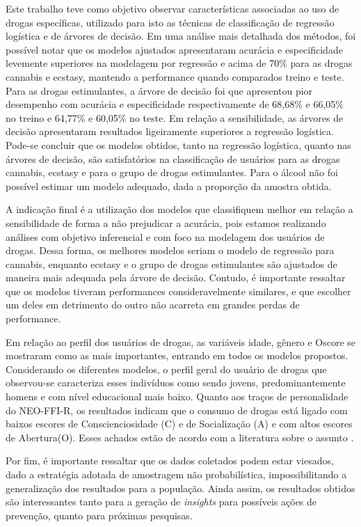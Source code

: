 \documentclass[
	article,			%
	11pt,				%
	oneside,			%
	a4paper,			%
	english,			%
	brazil,				%
	sumario=tradicional
	]{abntex2}
\begin{document}
Este trabalho teve como objetivo observar características associadas ao uso de drogas específicas, utilizado para isto as técnicas de classificação de regressão logística e de árvores de decisão. 
Em uma análise mais detalhada dos métodos, foi possível notar que os modelos ajustados apresentaram acurácia e especificidade levemente superiores na modelagem por regressão e acima de 70\% para as drogas cannabis e ecstasy, mantendo a performance quando comparados treino e teste. Para as drogas estimulantes, a árvore de decisão foi que apresentou pior desempenho com acurácia e especificidade respectivamente de 68,68\% e 66,05\% no treino e 64,77\% e 60,05\% no teste. Em relação a sensibilidade, as árvores de decisão apresentaram resultados ligeiramente superiores a regressão logística. Pode-se concluir que os modelos obtidos, tanto na regressão logística, quanto nas árvores de decisão, são satisfatórios na classificação de usuários para as drogas cannabis, ecstasy e para o grupo de drogas estimulantes. Para o álcool não foi possível estimar um modelo adequado, dada a proporção da amostra obtida.

A indicação final é a utilização dos modelos que classifiquem melhor em relação a sensibilidade de forma a não prejudicar a acurácia, pois estamos realizando análises com objetivo inferencial e com foco na modelagem dos usuários de drogas. Dessa forma, os melhores modelos seriam o modelo de regressão para cannabis, enquanto ecstasy e o grupo de drogas estimulantes são ajustados de maneira mais adequada pela árvore de decisão. Contudo, é importante ressaltar que os modelos tiveram performances consideravelmente similares, e que escolher um deles em detrimento do outro não acarreta em grandes perdas de performance.

Em relação ao perfil dos usuários de drogas, as variáveis idade, gênero e Oscore se mostraram como as mais importantes, entrando em todos os modelos propostos. Considerando os diferentes modelos, o perfil geral do usuário de drogas que observou-se caracteriza esses indivíduos como sendo jovens, predominantemente homens e com nível educacional mais baixo. Quanto aos traços de personalidade do NEO-FFI-R, os resultados indicam que o consumo de drogas está ligado com baixos escores de Conscienciosidade (C) e de Socialização (A) e com altos escores de Abertura(O). Esses achados estão de acordo com a literatura sobre o assunto \cite{fehrman2015}.

Por fim, é importante ressaltar que os dados coletados podem estar viesados, dado a estratégia adotada de amostragem não probabilística, impossibilitando a generalização dos resultados para a população. Ainda assim, os resultados obtidos são interessantes tanto para a geração de \emph{insights} para possíveis ações de prevenção, quanto para próximas pesquisas.
\end{document}
